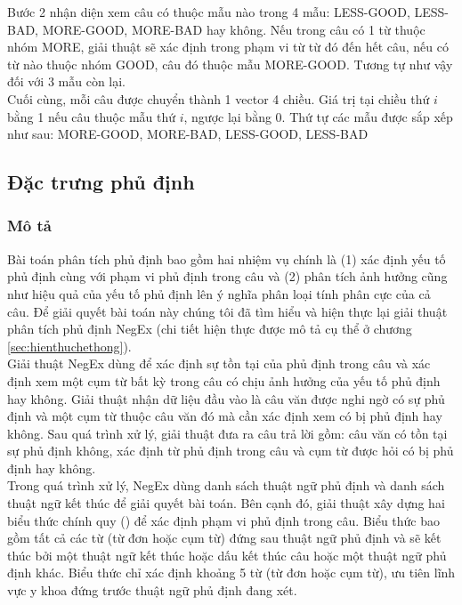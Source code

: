 Bước 2 nhận diện xem câu có thuộc mẫu nào trong 4 mẫu: LESS-GOOD, LESS-BAD, MORE-GOOD, MORE-BAD hay không. Nếu trong câu có 1 từ thuộc nhóm MORE, giải thuật sẽ xác định trong phạm vi từ từ đó đến hết câu, nếu có từ nào thuộc nhóm GOOD, câu đó thuộc mẫu MORE-GOOD. Tương tự như vậy đối với 3 mẫu còn lại.\\

Cuối cùng, mỗi câu được chuyển thành 1 vector 4 chiều. Giá trị tại chiều thứ $i$ bằng 1 nếu câu thuộc mẫu thứ $i$, ngược lại bằng 0. Thứ tự các mẫu được sắp xếp như sau: MORE-GOOD, MORE-BAD, LESS-GOOD, LESS-BAD

\subsection{Đặc trưng phủ định} \label{sec:su-phu-dinh} \label{subsec:negation}
\subsubsection*{Mô tả}
Bài toán phân tích phủ định bao gồm hai nhiệm vụ chính là (1) xác định yếu tố phủ định cùng với phạm vi phủ định trong câu và (2) phân tích ảnh hưởng cũng như hiệu quả của yếu tố phủ định lên ý nghĩa phân loại tính phân cực của cả câu. Để giải quyết bài toán này chúng tôi đã tìm hiểu và hiện thực lại giải thuật phân tích phủ định NegEx\cite{Tanushi2013} (chi tiết hiện thực được mô tả cụ thể ở chương \ref{sec:hienthuchethong}).\\

Giải thuật NegEx dùng để xác định sự tồn tại của phủ định trong câu và xác định xem một cụm từ bất kỳ trong câu có chịu ảnh hưởng của yếu tố phủ định hay không. Giải thuật nhận dữ liệu đầu vào là câu văn được nghi ngờ có sự phủ định và một cụm từ thuộc câu văn đó mà cần xác định xem có bị phủ định hay không. Sau quá trình xử lý, giải thuật đưa ra câu trả lời gồm: câu văn có tồn tại sự phủ định không, xác định từ phủ định trong câu và cụm từ được hỏi có bị phủ định hay không.\\ 

Trong quá trình xử lý, NegEx dùng danh sách thuật ngữ phủ định và danh sách thuật ngữ kết thúc để giải quyết bài toán. Bên cạnh đó, giải thuật xây dựng hai biểu thức chính quy  () để xác định phạm vi phủ định trong câu. Biểu thức  bao gồm tất cả các từ (từ đơn hoặc cụm từ) đứng sau thuật ngữ phủ định và sẽ kết thúc bởi một thuật ngữ kết thúc hoặc dấu kết thúc câu hoặc một thuật ngữ phủ định khác. Biểu thức  chỉ xác định khoảng 5 từ (từ đơn hoặc cụm từ), ưu tiên lĩnh vực y khoa đứng trước thuật ngữ phủ định đang xét. \\

